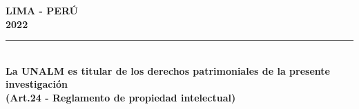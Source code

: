 \begin{titlepage}
    {\fontsize{14pt}{ \baselineskip}\selectfont \textbf{LIMA - PERÚ}}\\[0.5cm]
    {\fontsize{14pt}{ \baselineskip}\selectfont \textbf{2022}}
    
    \vfill %
    \singlespacing
    
    \rule{132mm}{0.25mm}\\
    {\small \textbf{La UNALM es titular de los derechos patrimoniales de la presente investigación\\ (Art.24 - Reglamento de propiedad intelectual)}}

\end{titlepage}
\restoregeometry
